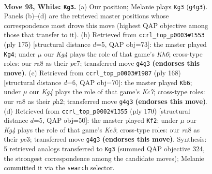 \documentclass[11pt]{article}
\begin{document}
\clearpage

\begin{figure}[p]\centering
\begin{subfigure}{0.46\textwidth}\centering
\resizebox{\linewidth}{!}{%
\newchessgame
\chessboard[
  setfen={r7/2k5/8/1R6/3r2KP/8/8/8 w - - 27 93},
  showmover=false,
  pgfstyle=straightmove, color=movearrow, markmove={g4-g3}
]}
\caption{}
\end{subfigure}\hfill
\begin{subfigure}{0.46\textwidth}\centering
\resizebox{\linewidth}{!}{%
\newchessgame
\chessboard[
  setfen={8/2P5/7R/8/3K4/7k/6p1/2r5 b - - 6 88},
  showmover=false,
  pgfstyle=straightmove, color=movearrow, markmove={h3-g4}
]}
\caption{}
\end{subfigure}
\\[4pt]
\begin{subfigure}{0.46\textwidth}\centering
\resizebox{\linewidth}{!}{%
\newchessgame
\chessboard[
  setfen={8/2KP4/8/5k2/2r5/8/7p/7R w - - 4 85},
  showmover=false,
  pgfstyle=straightmove, color=movearrow, markmove={c7-b6}
]}
\caption{}
\end{subfigure}\hfill
\begin{subfigure}{0.46\textwidth}\centering
\resizebox{\linewidth}{!}{%
\newchessgame
\chessboard[
  setfen={2R5/4k3/8/8/5P2/2p1K1r1/8/8 w - - 2 86},
  showmover=false,
  pgfstyle=straightmove, color=movearrow, markmove={e3-f2}
]}
\caption{}
\end{subfigure}
\caption{\textbf{Move 93, White: \texttt{Kg3}.} (a) Our position; Melanie plays \texttt{Kg3} (\texttt{g4g3}). Panels (b)--(d) are the retrieved master positions whose correspondence most drove this move (highest QAP objective among those that transfer to it). (b) Retrieved from \texttt{ccrl\_top\_p0003\#1553} (ply 175) [structural distance $d$=5, QAP obj=73]: the master played \texttt{Kg4}; under $\mu$ our \emph{Kg4} plays the role of that game's \emph{Kh6}; cross-type roles: our \emph{r}a8 as their \emph{p}c7; transferred move \texttt{g4g3} \textbf{(endorses this move)}. (c) Retrieved from \texttt{ccrl\_top\_p0003\#1987} (ply 168) [structural distance $d$=6, QAP obj=70]: the master played \texttt{Kb6}; under $\mu$ our \emph{Kg4} plays the role of that game's \emph{Kc7}; cross-type roles: our \emph{r}a8 as their \emph{p}h2; transferred move \texttt{g4g3} \textbf{(endorses this move)}. (d) Retrieved from \texttt{ccrl\_top\_p0002\#1355} (ply 170) [structural distance $d$=5, QAP obj=50]: the master played \texttt{Kf2}; under $\mu$ our \emph{Kg4} plays the role of that game's \emph{Ke3}; cross-type roles: our \emph{r}a8 as their \emph{p}c3; transferred move \texttt{g4g3} \textbf{(endorses this move)}. Synthesis: 5 retrieved analogs transferred to \texttt{Kg3} (summed QAP objective 324, the strongest correspondence among the candidate moves); Melanie committed it via the \texttt{search} selector.}
\label{fig:thought-m184}
\end{figure}
\end{document}
